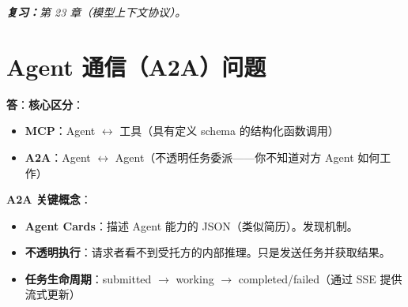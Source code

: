 \begin{questionbox}
\emph{\textbf{复习：}第 23 章（模型上下文协议）。}
\end{questionbox}

\section{Agent 通信（A2A）问题}
\label{agent-communication-a2a-questions}

\begin{questionbox}
\textbf{答}：\textbf{核心区分}：

\begin{itemize}
  \item \textbf{MCP}：Agent $\leftrightarrow$ 工具（具有定义 schema 的结构化函数调用）
  \item \textbf{A2A}：Agent $\leftrightarrow$ Agent（不透明任务委派——你不知道对方 Agent 如何工作）
\end{itemize}

\textbf{A2A 关键概念}：

\begin{itemize}
  \item \textbf{Agent Cards}：描述 Agent 能力的 JSON（类似简历）。发现机制。
  \item \textbf{不透明执行}：请求者看不到受托方的内部推理。只是发送任务并获取结果。
  \item \textbf{任务生命周期}：submitted $\to$ working $\to$ completed/failed（通过 SSE 提供流式更新）
\end{itemize}


\end{questionbox}
